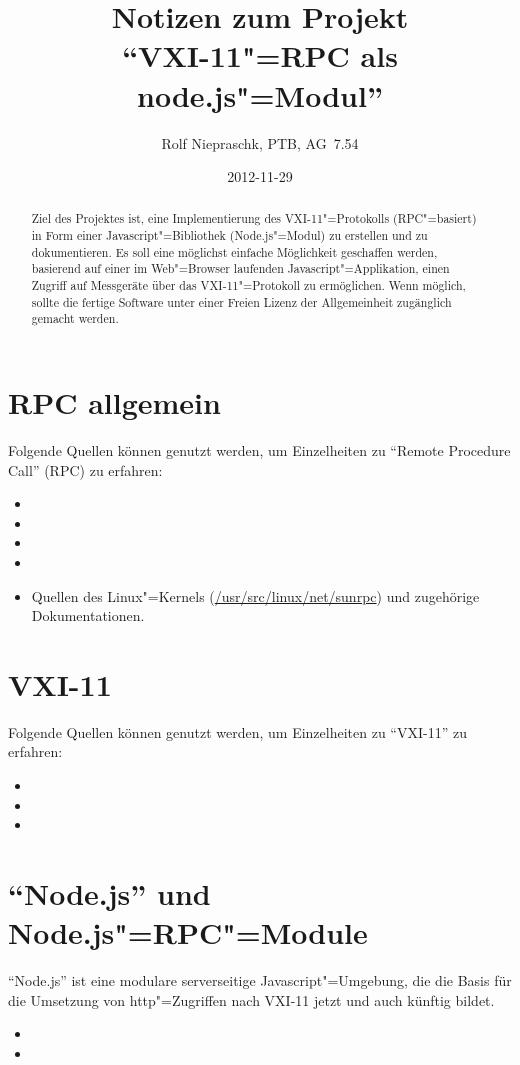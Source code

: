 \documentclass[%
fontsize=11pt
,paper=a4
,twoside
,headings=small
,pointednumbers
,pagesize
]{scrartcl}
\title{Notizen zum Projekt \\ "`VXI-11"=RPC als node.js"=Modul"'}
\date{2012-11-29}
\author{Rolf Niepraschk, PTB, AG~7.54}
\begin{document}
\maketitle
\begin{abstract}
  \noindent
  Ziel des Projektes ist, eine Implementierung des VXI-11"=Protokolls
  (RPC"=basiert) in Form einer Javascript"=Bibliothek (Node.js"=Modul) zu
  erstellen und zu dokumentieren. Es soll eine möglichst einfache
  Möglichkeit geschaffen werden, basierend auf einer im Web"=Browser
  laufenden Javascript"=Applikation, einen Zugriff auf Messgeräte über
  das VXI-11"=Protokoll zu ermöglichen. Wenn möglich, sollte die fertige
  Software unter einer Freien Lizenz der Allgemeinheit zugänglich gemacht
  werden.
\end{abstract}

\section{RPC allgemein}

Folgende Quellen können genutzt werden, um Einzelheiten zu "`Remote
Procedure Call"' (RPC) zu erfahren:

\begin{itemize}
  \item {}
  \item {}
  \item {}
  \item {}
  \item Quellen des Linux"=Kernels (\url{/usr/src/linux/net/sunrpc}) und
    zugehörige Dokumentationen.
\end{itemize}

\section{VXI-11}

Folgende Quellen können genutzt werden, um Einzelheiten zu "`VXI-11"'
zu erfahren:

\begin{itemize}
  \item {}
  \item {}
  \item {}
\end{itemize}

\section{"`Node.js"' und Node.js"=RPC"=Module}

"`Node.js"' ist eine modulare serverseitige Javascript"=Umgebung, die die Basis
für die Umsetzung von http"=Zugriffen nach VXI-11 jetzt und auch künftig bildet. 

\begin{itemize}
  \item {}
  \item {}
\end{itemize}
\end{document}
